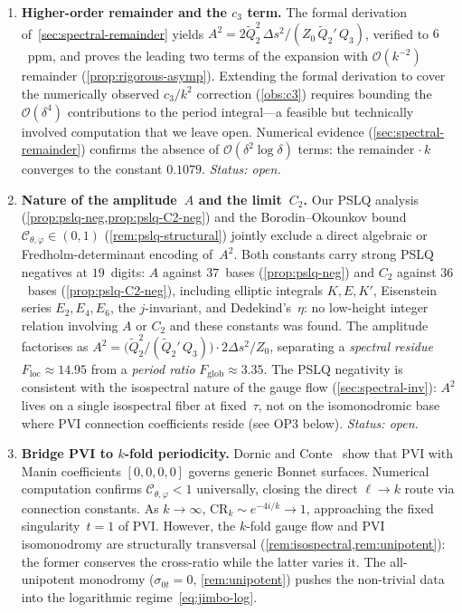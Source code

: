 \documentclass[11pt,a4paper]{article}
\theoremstyle{plain}
\theoremstyle{definition}
\theoremstyle{remark}
\newcommand{\Oo}{\mathcal{O}}
\begin{document}
\begin{enumerate}[label=\textbf{OP\arabic*.},nosep]
\item \textbf{Higher-order remainder and the $c_3$ term.}
  The formal derivation of~\cref{sec:spectral-remainder} yields
  $A^2 = 2\tilde Q_2^2\,\Delta s^2 / (Z_0\,\tilde Q_2'\,Q_3)$,
  verified to $6$~ppm, and proves the leading two terms of
  the expansion with $\Oo(k^{-2})$ remainder
  (\cref{prop:rigorous-asymp}).  Extending the formal
  derivation to cover the numerically observed $c_3/k^2$
  correction (\cref{obs:c3}) requires bounding the
  $\Oo(\delta^4)$ contributions to the period integral---a
  feasible but technically involved computation that we
  leave open.
  Numerical evidence (\cref{sec:spectral-remainder}) confirms
  the absence of $\Oo(\delta^2 \log \delta)$ terms: the remainder
  $\cdot\,k$ converges to the constant $0.1079$.
  \emph{Status: open.}

\item \textbf{Nature of the amplitude~$A$ and the limit~$C_2$.}
  Our PSLQ analysis (\cref{prop:pslq-neg,prop:pslq-C2-neg}) and the
  Borodin--Okounkov bound
  $\mathcal{C}_{\theta,\varphi} \in (0,1)$
  (\cref{rem:pslq-structural}) jointly exclude a direct
  algebraic or Fredholm-determinant encoding of~$A^2$.
  Both constants carry strong PSLQ negatives
  at $19$~digits: $A$ against $37$~bases
  (\cref{prop:pslq-neg}) and $C_2$ against $36$~bases
  (\cref{prop:pslq-C2-neg}), including elliptic integrals
  $K, E, K'$, Eisenstein series $E_2, E_4, E_6$, the
  $j$-invariant, and Dedekind's~$\eta$: no low-height
  integer relation involving $A$ or $C_2$ and these
  constants was found.
  The amplitude factorises as
  $A^2 = \bigl(\tilde Q_2^2/(\tilde Q_2'\,Q_3)\bigr)
         \cdot 2\Delta s^2/Z_0$,
  separating a \emph{spectral residue}
  $F_{\mathrm{loc}} \approx 14.95$
  from a \emph{period ratio}
  $F_{\mathrm{glob}} \approx 3.35$.
  The PSLQ negativity is consistent with the
  isospectral nature of the gauge flow
  (\cref{sec:spectral-inv}): $A^2$ lives on a single
  isospectral fiber at fixed~$\tau$, not on the
  isomonodromic base where PVI connection coefficients
  reside (see OP3 below).
  \emph{Status: open.}

\item \textbf{Bridge PVI to $k$-fold periodicity.}
  Dornic and Conte~\cite{DC26} show that PVI with Manin
  coefficients $[0,0,0,0]$ governs generic Bonnet surfaces.
  Numerical computation confirms
  $\mathcal{C}_{\theta,\varphi}<1$ universally, closing
  the direct $\ell\to k$ route via connection constants.
  As $k\to\infty$, $\mathrm{CR}_k \sim e^{-4i/k}\to 1$,
  approaching the fixed singularity~$t=1$ of PVI.
  However, the $k$-fold gauge flow and PVI isomonodromy
  are structurally transversal
  (\cref{rem:isospectral,rem:unipotent}): the former
  conserves the cross-ratio while the latter varies it.
  The all-unipotent monodromy ($\sigma_{0t}=0$,
  \cref{rem:unipotent}) pushes the non-trivial data into
  the logarithmic regime~\eqref{eq:jimbo-log}.


\end{enumerate}
\end{document}
